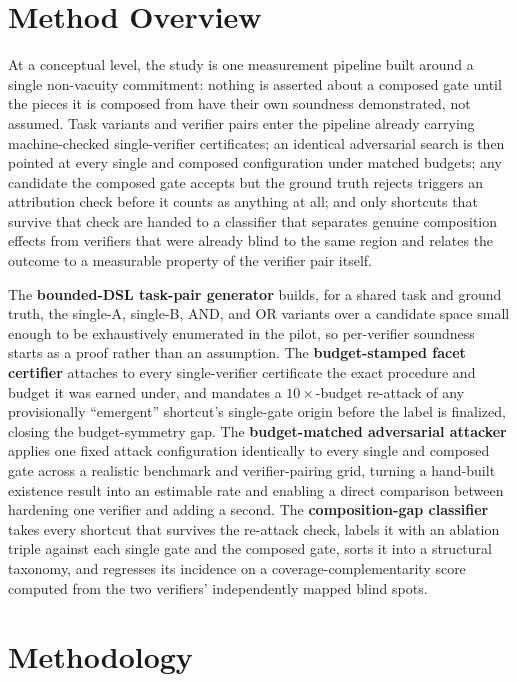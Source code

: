 \documentclass[11pt]{article}
\begin{document}
\section{Method Overview}

At a conceptual level, the study is one measurement pipeline built around a single non-vacuity commitment: nothing is asserted about a composed gate until the pieces it is composed from have their own soundness demonstrated, not assumed. Task variants and verifier pairs enter the pipeline already carrying machine-checked single-verifier certificates; an identical adversarial search is then pointed at every single and composed configuration under matched budgets; any candidate the composed gate accepts but the ground truth rejects triggers an attribution check before it counts as anything at all; and only shortcuts that survive that check are handed to a classifier that separates genuine composition effects from verifiers that were already blind to the same region and relates the outcome to a measurable property of the verifier pair itself.

The \textbf{bounded-DSL task-pair generator} builds, for a shared task and ground truth, the single-A, single-B, AND, and OR variants over a candidate space small enough to be exhaustively enumerated in the pilot, so per-verifier soundness starts as a proof rather than an assumption. The \textbf{budget-stamped facet certifier} attaches to every single-verifier certificate the exact procedure and budget it was earned under, and mandates a $10\times$-budget re-attack of any provisionally ``emergent'' shortcut's single-gate origin before the label is finalized, closing the budget-symmetry gap. The \textbf{budget-matched adversarial attacker} applies one fixed attack configuration identically to every single and composed gate across a realistic benchmark and verifier-pairing grid, turning a hand-built existence result into an estimable rate and enabling a direct comparison between hardening one verifier and adding a second. The \textbf{composition-gap classifier} takes every shortcut that survives the re-attack check, labels it with an ablation triple against each single gate and the composed gate, sorts it into a structural taxonomy, and regresses its incidence on a coverage-complementarity score computed from the two verifiers' independently mapped blind spots.

\section{Methodology}
\end{document}
